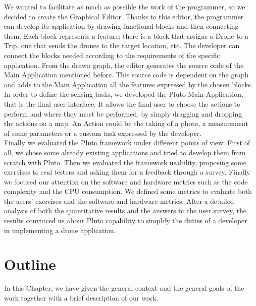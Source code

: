 We wanted to facilitate as much as possible the work of the programmer, so we decided to create the Graphical Editor.
Thanks to this editor, the programmer can develop its application by drawing functional blocks and then connecting them.
Each block represents a feature: there is a block that assigns a Drone to a Trip, one that sends the drones to the target location, etc.
The developer can connect the blocks needed according to the requirements of the specific application.
From the drawn graph, the editor generates the source code of the Main Application mentioned before. This source code is dependent on the graph and adds to the Main Application all the features expressed by the chosen blocks.
\\

In order to define the sensing tasks, we developed the Pluto Main Application, that is the final user interface.
It allows the final user to choose the actions to perform and where they must be performed, by simply dragging and dropping the actions on a map. 
An Action could be the taking of a photo, a measurement of some parameters or a custom task expressed by the developer.
\\

Finally we evaluated the Pluto framework under different points of view.
First of all, we chose some already existing applications and tried to develop them from scratch with Pluto.
Then we evaluated the framework usability, proposing some exercises to real testers and asking them for a feedback through a survey.
Finally we focused our attention on the software and hardware metrics such as the code complexity and the CPU consumption. 
We defined some metrics to evaluate both the users' exercises and the software and hardware metrics.
After a detailed analysis of both the quantitative results and the answers to the user survey,
the results convinced us about Pluto capability to simplify the duties of a developer in implementing a drone application.

\section{Outline}

In this Chapter, we have given the general context and the general goals of the work together with a brief description of our work.
\\

